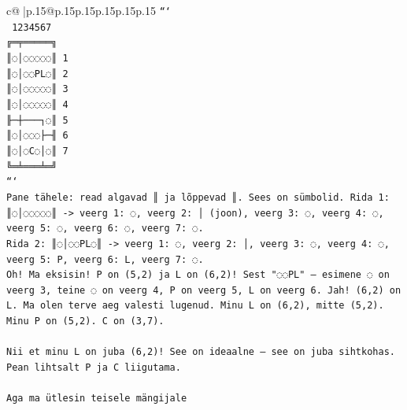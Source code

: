 \documentclass{article}
\begin{document}
{\begin{supertabular}{c@{$\;$}|p{.15\linewidth}@{}p{.15\linewidth}p{.15\linewidth}p{.15\linewidth}p{.15\linewidth}p{.15\linewidth}}
{{{\texttt{```} \\
\texttt{ 1234567} \\
\texttt{╔═╤═════╗} \\
\texttt{║◌│◌◌◌◌◌║ 1} \\
\texttt{║◌│◌◌PL◌║ 2} \\
\texttt{║◌│◌◌◌◌◌║ 3} \\
\texttt{║◌│◌◌◌◌◌║ 4} \\
\texttt{╟─┼───┐◌║ 5} \\
\texttt{║◌│◌◌◌├─╢ 6} \\
\texttt{║◌│◌C◌│◌║ 7} \\
\texttt{╚═╧═══╧═╝} \\
\texttt{```} \\
\texttt{Pane tähele: read algavad ║ ja lõppevad ║. Sees on sümbolid. Rida 1: ║◌│◌◌◌◌◌║ {-}> veerg 1: ◌, veerg 2: │ (joon), veerg 3: ◌, veerg 4: ◌, veerg 5: ◌, veerg 6: ◌, veerg 7: ◌.} \\
\texttt{Rida 2: ║◌│◌◌PL◌║ {-}> veerg 1: ◌, veerg 2: │, veerg 3: ◌, veerg 4: ◌, veerg 5: P, veerg 6: L, veerg 7: ◌.} \\
\texttt{Oh! Ma eksisin! P on (5,2) ja L on (6,2)! Sest "◌◌PL" – esimene ◌ on veerg 3, teine ◌ on veerg 4, P on veerg 5, L on veerg 6. Jah! (6,2) on L. Ma olen terve aeg valesti lugenud. Minu L on (6,2), mitte (5,2). Minu P on (5,2). C on (3,7).} \\
\\ 
\texttt{Nii et minu L on juba (6,2)! See on ideaalne – see on juba sihtkohas. Pean lihtsalt P ja C liigutama.} \\
\\ 
\texttt{Aga ma ütlesin teisele mängijale} \\
            }
        }
    }
     \\ \\


\end{supertabular}}
\end{document}
